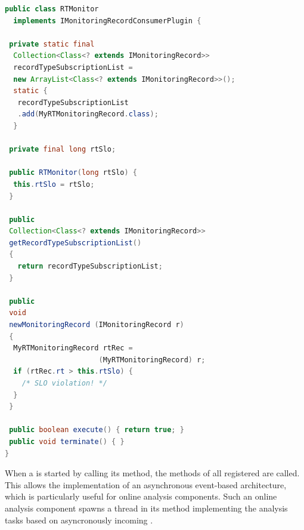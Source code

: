\begin{lstlisting}[float,language=Java, caption=Example response time monitor, label=lst:rtMonitor,escapechar=\%]
public class RTMonitor
  implements IMonitoringRecordConsumerPlugin {

 private static final 
  Collection<Class<? extends IMonitoringRecord>> 
  recordTypeSubscriptionList =
  new ArrayList<Class<? extends IMonitoringRecord>>();
  static {
   recordTypeSubscriptionList
   .add(MyRTMonitoringRecord.class);
  }

 private final long rtSlo;

 public RTMonitor(long rtSlo) {
  this.rtSlo = rtSlo;
 }

 public 
 Collection<Class<? extends IMonitoringRecord>>
 getRecordTypeSubscriptionList()
 {
   return recordTypeSubscriptionList;
 }

 public 
 void 
 newMonitoringRecord (IMonitoringRecord r) 
 {
  MyRTMonitoringRecord rtRec =
                      (MyRTMonitoringRecord) r;
  if (rtRec.rt > this.rtSlo) {
    /* SLO violation! */
  }
 }

 public boolean execute() { return true; }
 public void terminate() { }
}
\end{lstlisting}

When a \TpanInstance{} is started by calling its  method, the
 methods of all registered \MonitoringRecordConsumers{} %
are called. %
This allows the implementation of an asynchronous event-based architecture,
which is particularly useful for online analysis components. %
Such an online analysis component spawns a thread in its  %
method implementing the analysis tasks based on asyncronously incoming \MonitoringRecords{}. %
